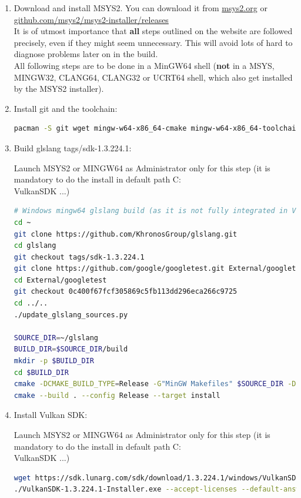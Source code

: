 \begin{enumerate}

\item Download and install MSYS2. You can download it from \href{https://www.msys2.org/}{msys2.org} or \href{https://github.com/msys2/msys2-installer/releases}{github.com/msys2/msys2-installer/releases}\\
It is of utmost importance that \textbf{all} steps outlined on the website are followed precisely, even if they might
seem unnecessary.
This will avoid lots of hard to diagnose problems later on in the build.\\

All following steps are to be done in a MinGW64 shell (\textbf{not} in a MSYS, MINGW32, CLANG64, CLANG32 or UCRT64 shell,
which also get installed by the MSYS2 installer).

\item Install git and the toolchain:

\begin{lstlisting}[language=sh, numbers=none]
pacman -S git wget mingw-w64-x86_64-cmake mingw-w64-x86_64-toolchain
\end{lstlisting}

\item Build glslang tags/sdk-1.3.224.1:

Launch MSYS2 or MINGW64 as Administrator only for this step (it is mandatory to do the install in default path C:\\VulkanSDK ...)
\begin{lstlisting}[language=sh, numbers=none]
# Windows mingw64 glslang build (as it is not fully integrated in VulkanSDK-1.3.224.1 for Windows and built with Visual Studio 2017)
cd ~
git clone https://github.com/KhronosGroup/glslang.git
cd glslang
git checkout tags/sdk-1.3.224.1
git clone https://github.com/google/googletest.git External/googletest
cd External/googletest
git checkout 0c400f67fcf305869c5fb113dd296eca266c9725
cd ../..
./update_glslang_sources.py

SOURCE_DIR=~/glslang
BUILD_DIR=$SOURCE_DIR/build
mkdir -p $BUILD_DIR
cd $BUILD_DIR
cmake -DCMAKE_BUILD_TYPE=Release -G"MinGW Makefiles" $SOURCE_DIR -DCMAKE_INSTALL_PREFIX="$(pwd)/install"
cmake --build . --config Release --target install
\end{lstlisting}

\item Install Vulkan SDK:

Launch MSYS2 or MINGW64 as Administrator only for this step (it is mandatory to do the install in default path C:\\VulkanSDK ...)
\begin{lstlisting}[language=sh, numbers=none]
wget https://sdk.lunarg.com/sdk/download/1.3.224.1/windows/VulkanSDK-1.3.224.1-Installer.exe
./VulkanSDK-1.3.224.1-Installer.exe --accept-licenses --default-answer --confirm-command install
\end{lstlisting}


\end{enumerate}
